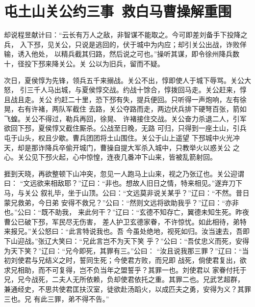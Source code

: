 \chapter{屯土山关公约三事~救白马曹操解重围}

却说程昱献计曰：“云长有万人之敌，非智谋不能取之。今可即差刘备手下投降之兵，
入下邳，见关公，只说是逃回的，伏于城中为内应；却引关公出战，诈败佯输，诱入他处，
以精兵截其归路，然后说之可也。”操听其谋，即令徐州降兵数十，径投下邳来降关公。关
公以为旧兵，留而不疑。

次日，夏侯惇为先锋，领兵五千来搦战。关公不出，惇即使人于城下辱骂。关公大怒，
引三千人马出城，与夏侯惇交战。约战十馀合，惇拨回马走。关公赶来，惇且战且走。关公
约赶二十里，恐下邳有失，提兵便回。只听得一声炮响，左有徐晃，右有许褚，两队军截住
去路，关公夺路而走，两边伏兵排下硬弩百张，箭如飞蝗。关公不得过，勒兵再回，徐晃、
许褚接住交战。关公奋力杀退二人，引军欲回下邳，夏侯惇又截住厮杀。公战至日晚，无路
可归，只得到一座土山，引兵屯于山头，权且少歇。曹兵团团将土山围住。关公于山上遥望
下邳城中火光冲天，却是那诈降兵卒偷开城门，曹操自提大军杀入城中，只教举火以惑关公
之心。关公见下邳火起，心中惊惶，连夜几番冲下山来，皆被乱箭射回。

捱到天晓，再欲整顿下山冲突，忽见一人跑马上山来，视之乃张辽也。关公迎谓曰：
“文远欲来相敌耶？”辽曰：“非也。想故人旧日之情，特来相见。”遂弃刀下马，与关公
叙礼毕，坐于山顶。公曰：“文远莫非说关某乎？”辽曰：“不然。昔日蒙兄救弟，今日弟
安得不救兄？”公曰：“然则文远将欲助我乎？”辽曰：“亦非也。”公曰：“既不助我，
来此何干？”辽曰：“玄德不知存亡，翼德未知生死。昨夜曹公已破下邳，军民尽无伤害，
差人护卫玄德家眷，不许惊忧。如此相待，弟特来报兄。”关公怒曰：“此言特说我也。吾
今虽处绝地，视死如归。汝当速去，吾即下山迎战。”张辽大笑曰：“兄此言岂不为天下笑
乎？”公曰：“吾仗忠义而死，安得为天下笑？”辽曰：“兄今即死，其罪有三。”公曰：
“汝且说我那三罪？”辽曰：“当初刘使君与兄结义之时，誓同生死；今使君方败，而兄即
战死，倘使君复出，欲求兄相助，而不可复得，岂不负当年之盟誓乎？其罪一也。刘使君以
家眷付托于兄，兄今战死，二夫人无所依赖，负却使君依托之重。其罪二也。兄武艺超群，
兼通经史，不思共使君匡扶汉室，徒欲赴汤蹈火，以成匹夫之勇，安得为义？其罪三也。兄
有此三罪，弟不得不告。”

